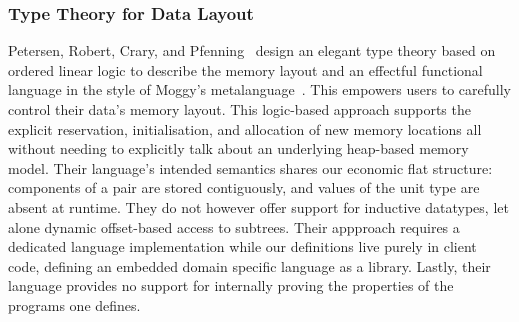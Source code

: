 \subsubsection{Type Theory for Data Layout}

Petersen, Robert, Crary, and Pfenning~\citeyearpar{DBLP:conf/popl/PetersenHCP03}
design an elegant type theory based on ordered linear logic
to describe the memory layout and an effectful functional
language in the style of Moggy's
metalanguage~\citeyearpar{DBLP:journals/iandc/Moggi91}.
This empowers users to carefully control their data's memory
layout.
%
This logic-based approach supports the explicit reservation,
initialisation, and allocation of new memory locations all
without needing to explicitly talk about an underlying
heap-based memory model.
%
Their language's intended semantics shares our economic flat
structure: components of a pair are stored contiguously,
and values of the unit type are absent at runtime.
They do not however offer support for inductive datatypes,
let alone dynamic offset-based access to subtrees.
%
Their appproach requires a dedicated language implementation
while our definitions live purely in client code, defining
an embedded domain specific language as a library.
%
Lastly, their language provides no support for internally
proving the properties of the programs one defines.
